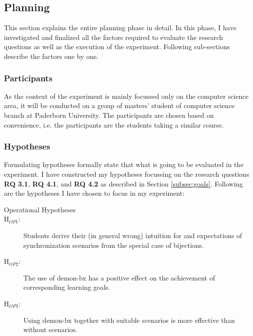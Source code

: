 \subsection{Planning}\label{subsec:planning}
This section explains the entire planning phase in detail. In this phase, I have investigated and  finalized all the factors required to evaluate the research questions as well as the execution of the experiment. Following sub-sections describe the factors one by one.

\subsubsection{Participants}\label{subsubsec:participants}
As the context of the experiment is mainly focussed only on the computer science area, it will be conducted on a group of masters' student of computer science branch at Paderborn University. The participants are chosen based on convenience, i.e. the participants are the students taking a similar course.

\subsubsection{Hypotheses}\label{subsubsec:hypotheses}
Formulating hypotheses formally state that what is going to be evaluated in the experiment. I have constructed my hypotheses focussing on the research questions \textbf{RQ 3.1}, \textbf{RQ 4.1}, and  \textbf{RQ 4.2} as described in Section \ref{subsec:goals}. Following are the hypotheses I have chosen to focus in my experiment:\\

\begin{description}
	\item[Operational Hypotheses]
	\item[H$_{OP1}$:] Students derive their (in general wrong) intuition for and expectations of synchronization scenarios from the special case of bijections.
	\item[H$_{OP2}$:] The use of demon-bx has a positive effect on the achievement of corresponding learning goals.\\
	\item[H$_{OP3}$:] Using demon-bx together with suitable scenarios is more effective than without scenarios.\\
\end{description}


